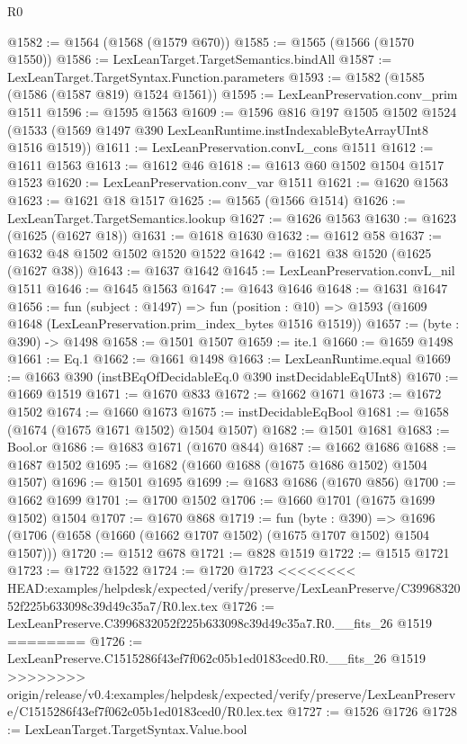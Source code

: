 \begin{lexlean}{R0}
\begin{coremodule}
{{{{{{{{{{{{{{{{{{{{{{{{{{{{{{{{{{{{{{{{{{{{{{{{{{{{{{{{{{{{{{{{{{{{{{{{{@1582 := @1564 (@1568 (@1579 @670))
@1585 := @1565 (@1566 (@1570 @1550))
@1586 := LexLeanTarget.TargetSemantics.bindAll
@1587 := LexLeanTarget.TargetSyntax.Function.parameters
@1593 := @1582 (@1585 (@1586 (@1587 @819) @1524 @1561))
@1595 := LexLeanPreservation.conv_prim @1511
@1596 := @1595 @1563
@1609 := @1596
    @816
    @197
    @1505
    @1502
    @1524
    (@1533 (@1569 @1497 @390 LexLeanRuntime.instIndexableByteArrayUInt8 @1516 @1519))
@1611 := LexLeanPreservation.convL_cons @1511
@1612 := @1611 @1563
@1613 := @1612 @46
@1618 := @1613 @60 @1502 @1504 @1517 @1523
@1620 := LexLeanPreservation.conv_var @1511
@1621 := @1620 @1563
@1623 := @1621 @18 @1517
@1625 := @1565 (@1566 @1514)
@1626 := LexLeanTarget.TargetSemantics.lookup
@1627 := @1626 @1563
@1630 := @1623 (@1625 (@1627 @18))
@1631 := @1618 @1630
@1632 := @1612 @58
@1637 := @1632 @48 @1502 @1502 @1520 @1522
@1642 := @1621 @38 @1520 (@1625 (@1627 @38))
@1643 := @1637 @1642
@1645 := LexLeanPreservation.convL_nil @1511
@1646 := @1645 @1563
@1647 := @1643 @1646
@1648 := @1631 @1647
@1656 := fun (subject : @1497) =>
  fun (position : @10) => @1593 (@1609 @1648 (LexLeanPreservation.prim_index_bytes @1516 @1519))
@1657 := (byte : @390) -> @1498
@1658 := @1501 @1507
@1659 := ite.{1}
@1660 := @1659 @1498
@1661 := Eq.{1}
@1662 := @1661 @1498
@1663 := LexLeanRuntime.equal
@1669 := @1663 @390 (instBEqOfDecidableEq.{0} @390 instDecidableEqUInt8)
@1670 := @1669 @1519
@1671 := @1670 @833
@1672 := @1662 @1671
@1673 := @1672 @1502
@1674 := @1660 @1673
@1675 := instDecidableEqBool
@1681 := @1658 (@1674 (@1675 @1671 @1502) @1504 @1507)
@1682 := @1501 @1681
@1683 := Bool.or
@1686 := @1683 @1671 (@1670 @844)
@1687 := @1662 @1686
@1688 := @1687 @1502
@1695 := @1682 (@1660 @1688 (@1675 @1686 @1502) @1504 @1507)
@1696 := @1501 @1695
@1699 := @1683 @1686 (@1670 @856)
@1700 := @1662 @1699
@1701 := @1700 @1502
@1706 := @1660 @1701 (@1675 @1699 @1502) @1504
@1707 := @1670 @868
@1719 := fun (byte : @390) =>
  @1696 (@1706 (@1658 (@1660 (@1662 @1707 @1502) (@1675 @1707 @1502) @1504 @1507)))
@1720 := @1512 @678
@1721 := @828 @1519
@1722 := @1515 @1721
@1723 := @1722 @1522
@1724 := @1720 @1723
<<<<<<<< HEAD:examples/helpdesk/expected/verify/preserve/LexLeanPreserve/C3996832052f225b633098c39d49c35a7/R0.lex.tex
@1726 := LexLeanPreserve.C3996832052f225b633098c39d49c35a7.R0.__fits_26 @1519
========
@1726 := LexLeanPreserve.C1515286f43ef7f062c05b1ed0183ced0.R0.__fits_26 @1519
>>>>>>>> origin/release/v0.4:examples/helpdesk/expected/verify/preserve/LexLeanPreserve/C1515286f43ef7f062c05b1ed0183ced0/R0.lex.tex
@1727 := @1526 @1726
@1728 := LexLeanTarget.TargetSyntax.Value.bool
}}}}}}}}}}}}}}}}}}}}}}}}}}}}}}}}}}}}}}}}}}}}}}}}}}}}}}}}}}}}}}}}}}}}}}}}}
\end{coremodule}
\end{lexlean}
